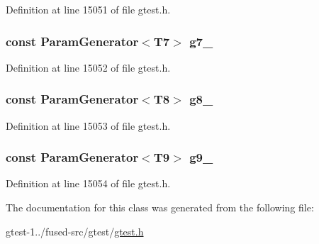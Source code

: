 \-Definition at line 15051 of file gtest.\-h.

\hypertarget{classtesting_1_1internal_1_1CartesianProductGenerator10_a55039ea79deff09f686dc351506af769}{
\subsubsection[{g7\-\_\-}]{\setlength{\rightskip}{0pt plus 5cm}const {\bf \-Param\-Generator}$<$\-T7$>$ {\bf g7\-\_\-}}}\label{d9/df4/classtesting_1_1internal_1_1CartesianProductGenerator10_a55039ea79deff09f686dc351506af769}


\-Definition at line 15052 of file gtest.\-h.

\hypertarget{classtesting_1_1internal_1_1CartesianProductGenerator10_afbac9ea419b43f592302c2d32cc25209}{
\subsubsection[{g8\-\_\-}]{\setlength{\rightskip}{0pt plus 5cm}const {\bf \-Param\-Generator}$<$\-T8$>$ {\bf g8\-\_\-}}}\label{d9/df4/classtesting_1_1internal_1_1CartesianProductGenerator10_afbac9ea419b43f592302c2d32cc25209}


\-Definition at line 15053 of file gtest.\-h.

\hypertarget{classtesting_1_1internal_1_1CartesianProductGenerator10_ac17a9d4be4bd621acb6910365beacf60}{
\subsubsection[{g9\-\_\-}]{\setlength{\rightskip}{0pt plus 5cm}const {\bf \-Param\-Generator}$<$\-T9$>$ {\bf g9\-\_\-}}}\label{d9/df4/classtesting_1_1internal_1_1CartesianProductGenerator10_ac17a9d4be4bd621acb6910365beacf60}


\-Definition at line 15054 of file gtest.\-h.



\-The documentation for this class was generated from the following file\-:\begin{DoxyCompactItemize}
\item 
gtest-\/1../fused-\/src/gtest/\hyperlink{fused-src_2gtest_2gtest_8h}{gtest.\-h}\end{DoxyCompactItemize}
